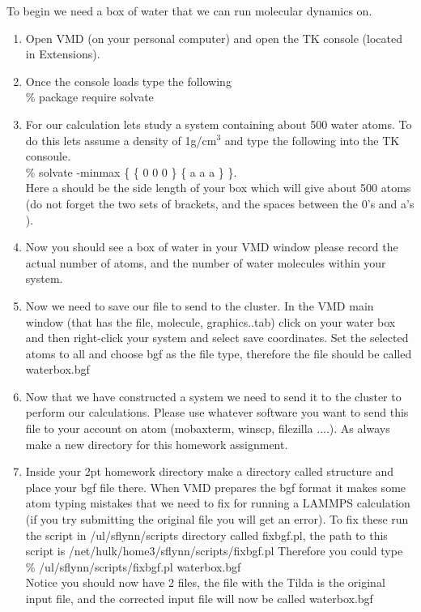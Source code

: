 \documentclass{article}
\begin{document}
To begin we need a box of water that we can run molecular dynamics on. 
\begin{enumerate}

    \item Open VMD (on your personal computer) and open the TK console (located in Extensions). \\
   
    \item Once the console loads type the following\\
\% package require solvate \\

\item For our calculation lets study a system containing about 500 water atoms.
To do this lets assume a density of 1g/cm$^3$ and type the following into the TK consoule.\\
\% solvate -minmax \{ \{ 0 0 0 \} \{ a a a \} \}.\\
Here a should be the side length of your box which will give about 500 atoms (do not forget the two sets of brackets, and the spaces between the 0's and a's ). \\

\item Now you should see a box of water in your VMD window please record the actual number of atoms, and the number of water molecules within your system.\\

\item Now we need to save our file to send to the cluster.
In the VMD main window (that has the file, molecule, graphics..tab) click on your water box and then right-click your system and select save coordinates. 
Set the selected atoms to all and choose bgf as the file type, therefore the file should be called waterbox.bgf \\

\item Now that we have constructed a system we need to send it to the cluster to perform our calculations. 
Please use whatever software you want to send this file to your account on atom (mobaxterm, winscp, filezilla ....). 
As always make a new directory for this homework assignment. \\

\item Inside your 2pt homework directory make a directory called structure and place your bgf file there.
When VMD prepares the bgf format it makes some atom typing mistakes that we need to fix for running a LAMMPS calculation (if you try submitting the original file you will get an error). 
To fix these run the script in /ul/sflynn/scripts directory called fixbgf.pl, the path to this script is /net/hulk/home3/sflynn/scripts/fixbgf.pl
Therefore you could type \\
\% /ul/sflynn/scripts/fixbgf.pl waterbox.bgf
\\
Notice you should now have 2 files, the file with the Tilda is the original input file, and the corrected input file will now be called waterbox.bgf\\


\end{enumerate}
\end{document}
